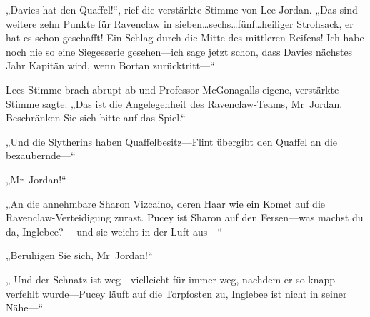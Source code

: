 „Davies hat den Quaffel!“, rief die verstärkte Stimme von Lee Jordan.
„Das sind weitere zehn Punkte für Ravenclaw in sieben…sechs…fünf…heiliger Strohsack, er hat es schon geschafft! Ein Schlag durch die Mitte des mittleren Reifens! Ich habe noch nie so eine Siegesserie gesehen—ich sage jetzt schon, dass Davies nächstes Jahr Kapitän wird, wenn Bortan zurücktritt—“

Lees Stimme brach abrupt ab und Professor McGonagalls eigene, verstärkte Stimme sagte: „Das ist die Angelegenheit des Ravenclaw-Teams, Mr~Jordan. Beschränken Sie sich bitte auf das Spiel.“

„Und die Slytherins haben Quaffelbesitz—Flint übergibt den Quaffel an die bezaubernde—“

„Mr~Jordan!“

„An die annehmbare Sharon Vizcaino, deren Haar wie ein Komet auf die Ravenclaw-Verteidigung zurast. Pucey ist Sharon auf den Fersen—was machst du da, Inglebee? —und sie weicht in der Luft aus—“

„Beruhigen Sie sich, Mr~Jordan!“

„ Und der Schnatz ist weg—vielleicht für immer weg, nachdem er so knapp verfehlt wurde—Pucey läuft auf die Torpfosten zu, Inglebee ist nicht in seiner Nähe—“

